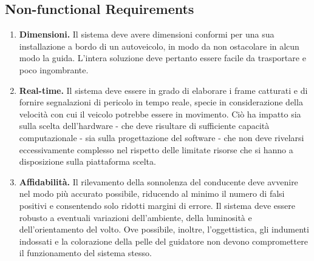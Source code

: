 \documentclass[12pt]{article}
\begin{document}
\subsection{Non-functional Requirements}
\begin{enumerate}
	\item \textbf{Dimensioni.} Il sistema deve avere dimensioni conformi per una sua installazione a bordo di un autoveicolo, in modo da non ostacolare in alcun modo la guida. L'intera soluzione deve pertanto essere facile da trasportare e poco ingombrante.
	\item \textbf{Real-time.} Il sistema deve essere in grado di elaborare i frame catturati e di fornire segnalazioni di pericolo in tempo reale, specie in considerazione della velocità con cui il veicolo potrebbe essere in movimento. Ciò ha impatto sia sulla scelta dell'hardware - che deve risultare di sufficiente capacità computazionale - sia sulla progettazione del software - che non deve rivelarsi eccessivamente complesso nel rispetto delle limitate risorse che si hanno a disposizione sulla piattaforma scelta.
	\item \textbf{Affidabilità.} Il rilevamento della sonnolenza del conducente deve avvenire nel modo più accurato possibile, riducendo al minimo il numero di falsi positivi e consentendo solo ridotti margini di errore. Il sistema deve essere robusto a eventuali variazioni dell'ambiente, della luminosità e dell'orientamento del volto. Ove possibile, inoltre, l'oggettistica, gli indumenti indossati e la colorazione della pelle del guidatore non devono compromettere il funzionamento del sistema stesso.
\end{enumerate}
\end{document}
